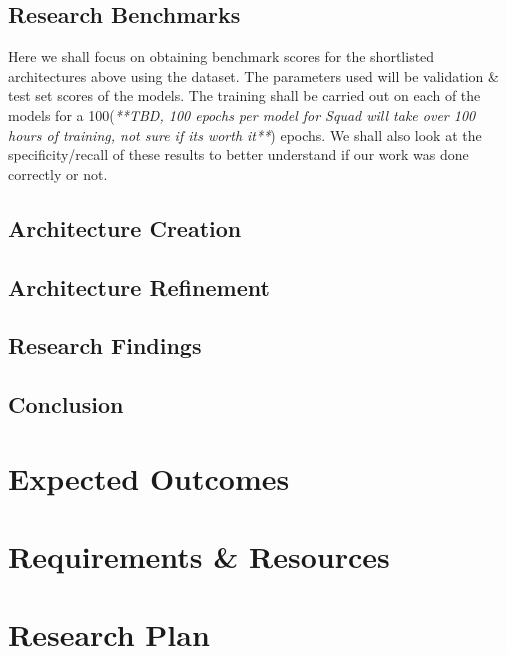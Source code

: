 \documentclass[11pt]{article}
\begin{document}
\subsection{Research Benchmarks}
Here we shall focus on obtaining benchmark scores for the shortlisted architectures above using the dataset\cite{dataset}. The parameters used will be validation \& test set scores of the models. The training shall be carried out on each of the models for a 100(\textit{**TBD, 100 epochs per model for Squad will take over 100 hours of training, not sure if its worth it**}) epochs. We shall also look at the specificity/recall of these results to better understand if our work was done correctly or not.
\subsection{Architecture Creation}
\subsection{Architecture Refinement}
\subsection{Research Findings}
\subsection{Conclusion}
\section{Expected Outcomes}
\section{Requirements \& Resources}
\section{Research Plan}


\end{document}
